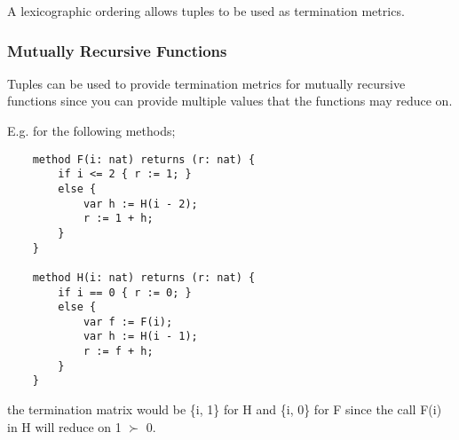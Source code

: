 A lexicographic ordering allows tuples to be used as termination metrics. 

\subsubsection{Mutually Recursive Functions}
Tuples can be used to provide termination metrics for mutually recursive functions since you can provide multiple values that the functions may reduce on.

E.g. for the following methods;
\begin{verbatim}
    method F(i: nat) returns (r: nat) { 
        if i <= 2 { r := 1; } 
        else {
            var h := H(i - 2);
            r := 1 + h; 
        } 
    } 

    method H(i: nat) returns (r: nat) { 
        if i == 0 { r := 0; } 
        else { 
            var f := F(i); 
            var h := H(i - 1); 
            r := f + h; 
        } 
    }
\end{verbatim}
the termination matrix would be \{i, 1\} for H and \{i, 0\} for F since the call F(i) in H will reduce on 1 $\succ$ 0. 